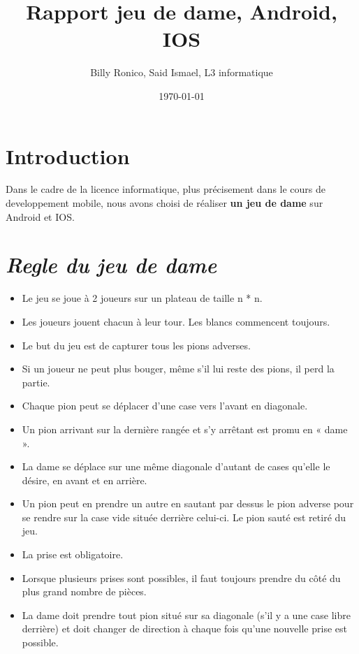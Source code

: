 \documentclass{article}
\title{Rapport jeu de dame, Android, IOS}
\author{Billy Ronico, Said Ismael, L3 informatique}
\date{\today}
\begin{document}
\maketitle %


\section{Introduction}
\label{section:intro} %

Dans le cadre de la licence informatique, plus précisement dans le cours de developpement 
mobile, nous avons choisi de réaliser \textbf{un jeu de dame} sur Android et IOS.

\section{\textit{Regle du jeu de dame}~\cite{regleJeuDame}} 

\begin{itemize}
  \item Le jeu se joue à 2 joueurs sur un plateau de taille n * n.
  \item Les joueurs jouent chacun à leur tour. Les blancs commencent toujours.
  \item Le but du jeu est de capturer tous les pions adverses. 
  \item Si un joueur ne peut plus bouger, même s'il lui reste des pions, il perd la partie. 
  \item Chaque pion peut se déplacer d'une case vers l'avant en diagonale. 
  \item Un pion arrivant sur la dernière rangée et s'y arrêtant est promu en « dame ».
  \item La dame se déplace sur une même diagonale d'autant de cases qu'elle le désire, en avant et en arrière.
  \item Un pion peut en prendre un autre en sautant par dessus le pion adverse
   pour se rendre sur la case vide située derrière celui-ci. Le pion sauté est retiré du jeu.
  \item La prise est obligatoire.
  \item Lorsque plusieurs prises sont possibles, 
  il faut toujours prendre du côté du plus grand nombre de pièces.
  \item La dame doit prendre tout pion situé sur sa diagonale 
  (s'il y a une case libre derrière) et doit changer de direction à chaque 
  fois qu'une  nouvelle prise est possible. 
\end{itemize}
\end{document}
